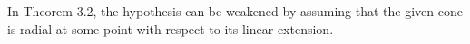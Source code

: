In Theorem 3.2, the hypothesis can be weakened by assuming that the given cone is radial at some point with respect to its linear extension.
